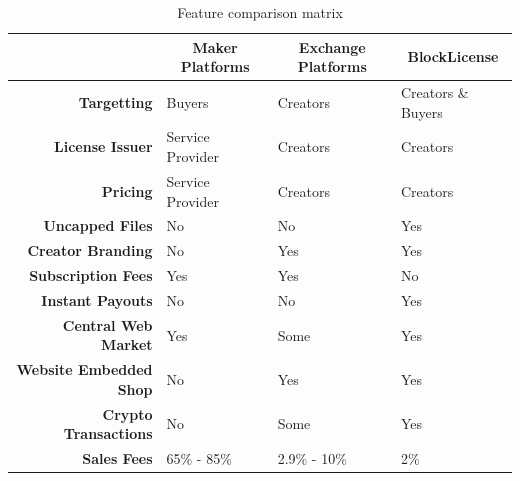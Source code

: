 \begin{table}[t]
\centering
\begin{tabular}{@{}rlll@{}}
\toprule
\multicolumn{1}{l}{}         & \multicolumn{1}{c}{\textbf{Maker Platforms}} & \multicolumn{1}{c}{\textbf{Exchange Platforms}} & \multicolumn{1}{c}{\textbf{BlockLicense}} \\ \midrule
\textbf{Targetting}          & Buyers                                       & Creators                                        & Creators \& Buyers                        \\
\textbf{License Issuer}      & Service Provider                             & Creators                                        & Creators                                  \\
\textbf{Pricing}             & Service Provider                             & Creators                                        & Creators                                  \\
\textbf{Uncapped Files}      & No                                           & No                                              & Yes                                       \\
\textbf{Creator Branding}    & No                                           & Yes                                             & Yes                                       \\
\textbf{Subscription Fees}   & Yes                                          & Yes                                             & No                                        \\
\textbf{Instant Payouts}     & No                                           & No                                              & Yes                                       \\
\textbf{Central Web Market}  & Yes                                          & Some                                              & Yes                                       \\
\textbf{Website Embedded Shop}	& No                                           & Yes                                             & Yes                                       \\
\textbf{Crypto Transactions} & No                                           & Some                                              & Yes                                       \\
\textbf{Sales Fees}          & 65\% - 85\%                                  & 2.9\% - 10\%                                    & 2\%                                       \\ \bottomrule
\end{tabular}
\caption{Feature comparison matrix}
\label{comp-matrix}
\end{table}




